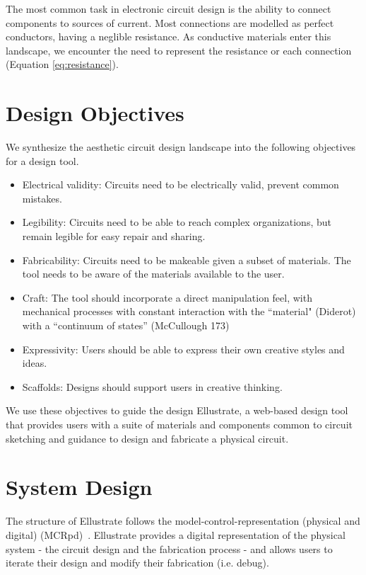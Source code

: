 \documentclass{sigchi}
\begin{document}
  The most common task in electronic circuit design is the ability to connect components to sources of current. Most connections are modelled as perfect conductors, having a neglible resistance. As conductive materials enter this landscape, we encounter the need to represent the resistance or each connection (Equation \ref{eq:resistance}).


\section{Design Objectives}
  We synthesize the aesthetic circuit design landscape into the following objectives for a design tool. 
    
    \begin{itemize}
        \item Electrical validity: Circuits need to be electrically valid, prevent common mistakes.
        \item Legibility: Circuits need to be able to reach complex organizations, but remain legible for easy repair and sharing. 
        \item Fabricability: Circuits need to be makeable given a subset of materials. The tool needs to be aware of the materials available to the user. 
        \item Craft: The tool should incorporate a direct manipulation feel, with mechanical processes with constant interaction with the ``material" (Diderot) with a  ``continuum of states'' (McCullough 173)
        \item Expressivity: Users should be able to express their own creative styles and ideas. 
        \item Scaffolds: Designs should support users in creative thinking. 
    \end{itemize}
We use these objectives to guide the design Ellustrate, a web-based design tool that provides users with a suite of materials and components common to circuit sketching and guidance to design and fabricate a physical circuit.

\section{System Design}
The structure of Ellustrate follows the model-control-representation (physical and digital) (MCRpd)~\cite{ullmer2000emerging}. Ellustrate provides a digital representation of the physical system - the circuit design and the fabrication process - and allows users to iterate their design and modify their fabrication (i.e. debug). 
\end{document}
